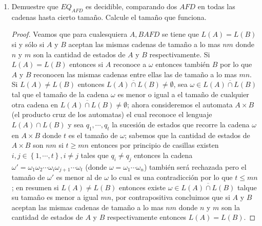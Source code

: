 \documentclass[letterpaper]{article}
\theoremstyle{definition}
\theoremstyle{lemathm}
\theoremstyle{lemathm}
\theoremstyle{lemathm}
\theoremstyle{lemademthm}
\newcommand{\pars}[1]{\left( #1 \right) }
\newcommand{\inprod}[1]{\left\langle #1 \right\rangle }
\newcommand{\set}[1]{\left \{ #1 \right\} }
\newcommand{\1}{\mathbbm{1}}
\begin{document}
\begin{enumerate}
\begin{proof}
				Luego la siguiente $MT \ L$ decide a $A_{AFD}$.

				L = "Sobre la entrada $\inprod{A}$ donde $A$ es un $AFD$:
				\begin{enumerate}
					\item Sea $AFD B$ que reconozca a $L\pars{R}\cap \overline{L\pars{S}}$.
					\item Sea $MT \ T$ que decida al lenguaje $E_{AFD}$. Ejecuta $T$ con la entrada $\inprod{B}$.
					\item Si $T$ acepta, acepta, Si $T$ rechaza, rechaza.
				\end{enumerate}

				Si $\inprod{A} \in A$ si y sólo si $L\pars{R}\cap \overline{L\pars{S}} = \emptyset$, como $T$ reconoce a $E_{AFD}$ concluimos que $L$ reconoce a $A$.
			\end{proof}

			\item Demuestre que $EQ_{AFD}$ es decidible, comparando dos $AFD$ en todas las cadenas hasta cierto tamaño. Calcule el tamaño que funciona.
			
			\begin{proof}
				Veamos que para cualesquiera $A,B AFD$ se tiene que $L\pars{A} = L\pars{B}$ si y sólo si $A$ y $B$ aceptan las mismas cadenas de tamaño a lo mas $nm$ donde $n$ y $m$ son la cantidad de estados de $A$ y $B$ respectivamente. Si $L\pars{A} = L\pars{B}$ entonces si $A$ reconoce a $\omega$ entonces también $B$ por lo que $A$ y $B$ reconocen las mismas cadenas entre ellas las de tamaño a lo mas $mn$. Si $L\pars{A} \neq L\pars{B}$ entonces $\overline{L\pars{A} \cap L\pars{B}} \neq \emptyset$, sea $\omega \in \overline{L\pars{A} \cap L\pars{B}}$ tal que el tamaño de la cadena $\omega$ es menor o igual a el tamaño de cualquier otra cadena en $\overline{L\pars{A} \cap L\pars{B}} \neq \emptyset$; ahora consideremos el automata $A\times B$ (el producto cruz de los automatas) el cual reconoce el lenguaje $L\pars{A}\cap L\pars{B}$ y sea $q_1,\cdots,q_t$ la sucesión de estados que recorre la cadena $\omega$ en $A\times B$ donde $t$ es el tamaño de $\omega$; sabemos que la cantidad de estados de $A \times B$ son $nm$ si $t \geq mn$ entonces por principio de casillas existen $i,j \in \set{1,\cdots, t}, i\neq j$ tales que $q_i \neq q_j$ entonces la cadena $\omega' = \omega_1\omega_2\cdots\omega_i\omega_{j+1}\cdots\omega_{t}$ (donde $\omega = \omega_1\cdots\omega_n$) también será rechazada pero el tamaño de $\omega'$ es menor al de $\omega$ lo cual es una contradicción por lo que $t \leq mn$; en resumen si $L\pars{A} \neq L\pars{B}$ entonces existe $\omega \in \overline{L\pars{A} \cap L\pars{B}}$ talque su tamaño es menor a igual $mn$, por contrapositiva concluimos que si $A$ y $B$ aceptan las mismas cadenas de tamaño a lo mas $nm$ donde $n$ y $m$ son la cantidad de estados de $A$ y $B$ respectivamente entonces $L\pars{A} = L\pars{B}$.
				

\end{proof}
\end{enumerate}
\end{document}
